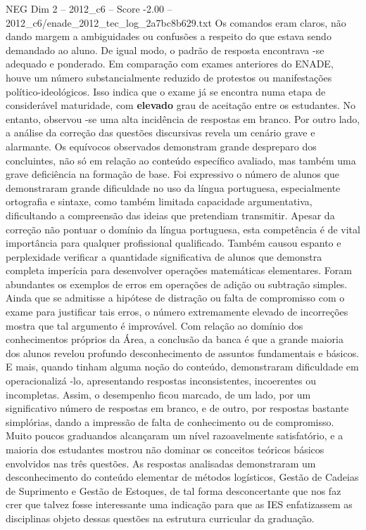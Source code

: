 \begin{textsample}{NEG Dim 2 – 2012\_c6 – Score -2.00 – 2012\_c6/enade\_2012\_tec\_log\_2a7bc8b629.txt}
Os comandos eram claros, não dando margem a ambiguidades ou confusões a respeito do que estava sendo demandado ao aluno.
De igual modo, o padrão de resposta encontrava -se adequado e ponderado.
Em comparação com exames anteriores do ENADE, houve um número substancialmente reduzido de protestos ou manifestações político-ideológicos.
Isso indica que o exame já se encontra numa etapa de considerável maturidade, com \textbf{elevado} grau de aceitação entre os estudantes.
No entanto, observou -se uma alta incidência de respostas em branco.
Por outro lado, a análise da correção das questões discursivas revela um cenário grave e alarmante.
Os equívocos observados demonstram grande despreparo dos concluintes, não só em relação ao conteúdo específico avaliado, mas também uma grave deficiência na formação de base.
Foi expressivo o número de alunos que demonstraram grande dificuldade no uso da língua portuguesa, especialmente ortografia e sintaxe, como também limitada capacidade argumentativa, dificultando a compreensão das ideias que pretendiam transmitir.
Apesar da correção não pontuar o domínio da língua portuguesa, esta competência é de vital importância para qualquer profissional qualificado.
Também causou espanto e perplexidade verificar a quantidade significativa de alunos que demonstra completa imperícia para desenvolver operações matemáticas elementares.
Foram abundantes os exemplos de erros em operações de adição ou subtração simples.
Ainda que se admitisse a hipótese de distração ou falta de compromisso com o exame para justificar tais erros, o número extremamente elevado de incorreções mostra que tal argumento é improvável.
Com relação ao domínio dos conhecimentos próprios da Área, a conclusão da banca é que a grande maioria dos alunos revelou profundo desconhecimento de assuntos fundamentais e básicos.
E mais, quando tinham alguma noção do conteúdo, demonstraram dificuldade em operacionalizá -lo, apresentando respostas inconsistentes, incoerentes ou incompletas.
Assim, o desempenho ficou marcado, de um lado, por um significativo número de respostas em branco, e de outro, por respostas bastante simplórias, dando a impressão de falta de conhecimento ou de compromisso.
Muito poucos graduandos alcançaram um nível razoavelmente satisfatório, e a maioria dos estudantes mostrou não dominar os conceitos teóricos básicos envolvidos nas três questões.
As respostas analisadas demonstraram um desconhecimento do conteúdo elementar de métodos logísticos, Gestão de Cadeias de Suprimento e Gestão de Estoques, de tal forma desconcertante que nos faz crer que talvez fosse interessante uma indicação para que as IES enfatizassem as disciplinas objeto dessas questões na estrutura curricular da graduação.

\end{textsample}
